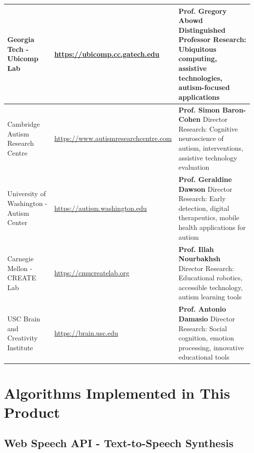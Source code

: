 \documentclass[11pt, a4paper]{article}
\begin{document}
\begin{longtable}{|>{\raggedright}p{4.5cm}|>{\raggedright}p{4cm}|>{\raggedright\arraybackslash}p{5.5cm}|}
Georgia Tech - Ubicomp Lab & 
\url{https://ubicomp.cc.gatech.edu} & 
\textbf{Prof. Gregory Abowd}
\newline Distinguished Professor
\newline Research: Ubiquitous computing, assistive technologies, autism-focused applications \\
\hline

Cambridge Autism Research Centre & 
\url{https://www.autismresearchcentre.com} & 
\textbf{Prof. Simon Baron-Cohen}
\newline Director
\newline Research: Cognitive neuroscience of autism, interventions, assistive technology evaluation \\
\hline

University of Washington - Autism Center & 
\url{https://autism.washington.edu} & 
\textbf{Prof. Geraldine Dawson}
\newline Director
\newline Research: Early detection, digital therapeutics, mobile health applications for autism \\
\hline

Carnegie Mellon - CREATE Lab & 
\url{https://cmucreatelab.org} & 
\textbf{Prof. Illah Nourbakhsh}
\newline Director
\newline Research: Educational robotics, accessible technology, autism learning tools \\
\hline

USC Brain and Creativity Institute & 
\url{https://brain.usc.edu} & 
\textbf{Prof. Antonio Damasio}
\newline Director
\newline Research: Social cognition, emotion processing, innovative educational tools \\
\hline

\end{longtable}
\renewcommand{\arraystretch}{1}

\newpage

\section{Algorithms Implemented in This Product}

\subsection{Web Speech API - Text-to-Speech Synthesis}
\end{document}
